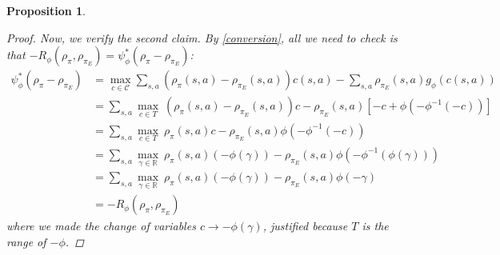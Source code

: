 \documentclass{article}
\newtheorem{proposition}{Proposition}[section]
\newcommand\bbR{\ensuremath{\mathbb{R}}} %
\newcommand{\1}{\mathbb{I}} %
\begin{document}
\begin{proposition}
\begin{proof}
Now, we verify the second claim.
By \cref{conversion}, all we need to check is that $-R_\phi(\rho_\pi, \rho_{\pi_E}) = \psi_\phi^*(\rho_\pi-\rho_{\pi_E})$:
\begin{align}
\psi_\phi^*(\rho_\pi-\rho_{\pi_E}) &= \max_{c\in\mathcal{C}} \sum_{s,a}(\rho_\pi(s,a)-\rho_{\pi_E}(s,a))c(s,a) - \sum_{s,a}\rho_{\pi_E}(s,a)g_\phi(c(s,a))  \\
&=  \sum_{s,a} \max_{c \in T}\ (\rho_\pi(s,a)-\rho_{\pi_E}(s,a))c - \rho_{\pi_E}(s,a)[-c + \phi(-\phi^{-1}(-c))] \\
&=  \sum_{s,a} \max_{c \in T}\ \rho_\pi(s,a)c - \rho_{\pi_E}(s,a)\phi(-\phi^{-1}(-c)) \\
&=  \sum_{s,a} \max_{\gamma \in \bbR}\ \rho_\pi(s,a)(-\phi(\gamma)) - \rho_{\pi_E}(s,a)\phi(-\phi^{-1}(\phi(\gamma))) \\
&=  \sum_{s,a} \max_{\gamma \in \bbR}\ \rho_\pi(s,a)(-\phi(\gamma)) - \rho_{\pi_E}(s,a)\phi(-\gamma) \\
&= -R_\phi(\rho_\pi, \rho_{\pi_E})
\end{align}
where we made the change of variables $c \rightarrow -\phi(\gamma)$, justified because $T$ is the range of $-\phi$.
\end{proof}
\end{proposition}
\end{document}
